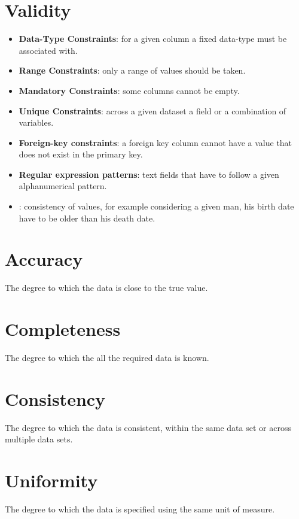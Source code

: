 \section{Validity}
\begin{itemize}
    \item \textbf{Data-Type Constraints}: for a given column a fixed data-type must be associated with.
    \item \textbf{Range Constraints}: only a range of values should be taken.
    \item \textbf{Mandatory Constraints}: some columns cannot be empty.
    \item \textbf{Unique Constraints}: across a given dataset a field or a combination of variables.
    \item \textbf{Foreign-key constraints}: a foreign key column cannot have a value that
        does not exist in the primary key.
    \item \textbf{Regular expression patterns}: text fields that have to follow a given 
        alphanumerical pattern.
    \item {}: consistency of values, for example considering
        a given man, his birth date have to be older than his death date.
\end{itemize}

\section{Accuracy}
The degree to which the data is close to the true value.

\section{Completeness}
The degree to which the all the required data is known.

\section{Consistency}
The degree to which the data is consistent, within the same data set or across multiple 
data sets.

\section{Uniformity}
The degree to which the data is specified using the same unit of measure.
